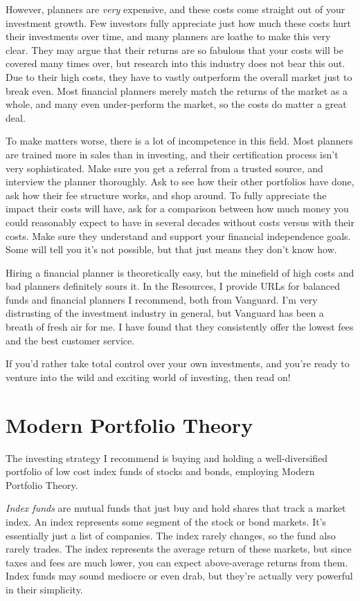 However, planners are \emph{very} expensive, and these costs come straight out of your investment growth. Few investors fully appreciate just how much these costs hurt their investments over time, and many planners are loathe to make this very clear. They may argue that their returns are so fabulous that your costs will be covered many times over, but research into this industry does not bear this out. Due to their high costs, they have to vastly outperform the overall market just to break even. Most financial planners merely match the returns of the market as a whole, and many even under-perform the market, so the costs do matter a great deal.

To make matters worse, there is a lot of incompetence in this field. Most planners are trained more in sales than in investing, and their certification process isn't very sophisticated. Make sure you get a referral from a trusted source, and interview the planner thoroughly. Ask to see how their other portfolios have done, ask how their fee structure works, and shop around. To fully appreciate the impact their costs will have, ask for a comparison between how much money you could reasonably expect to have in several decades without costs versus with their costs. Make sure they understand and support your financial independence goals. Some will tell you it's not possible, but that just means they don't know how.

Hiring a financial planner is theoretically easy, but the minefield of high costs and bad planners definitely sours it. In the Resources, I provide URLs for balanced funds and financial planners I recommend, both from Vanguard. I'm very distrusting of the investment industry in general, but Vanguard has been a breath of fresh air for me. I have found that they consistently offer the lowest fees and the best customer service.

If you'd rather take total control over your own investments, and you're ready to venture into the wild and exciting world of investing, then read on!

\section{Modern Portfolio Theory}
The investing strategy I recommend is buying and holding a well-diversified portfolio of low cost index funds of stocks and bonds, employing Modern Portfolio Theory.

\emph{Index funds} are mutual funds that just buy and hold shares that track a market index. An index represents some segment of the stock or bond markets. It's essentially just a list of companies. The index rarely changes, so the fund also rarely trades. The index represents the average return of these markets, but since taxes and fees are much lower, you can expect above-average returns from them. Index funds may sound mediocre or even drab, but they're actually very powerful in their simplicity.

